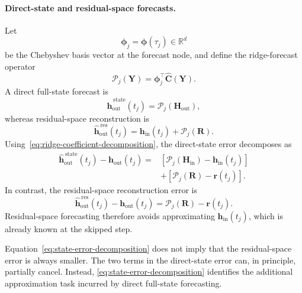 \paragraph{Direct-state and residual-space forecasts.}
Let
\begin{equation}
\boldsymbol{\phi}_j
=
\boldsymbol{\phi}(\tau_j)
\in\mathbb{R}^{d}
\end{equation}
be the Chebyshev basis vector at the forecast node, and define the
ridge-forecast operator
\begin{equation}
\mathcal{P}_j(\mathbf{Y})
=
\boldsymbol{\phi}_j^\top
\widehat{\mathbf{C}}(\mathbf{Y}).
\label{eq:ridge-forecast-operator}
\end{equation}
A direct full-state forecast is
\begin{equation}
\widehat{\mathbf{h}}_{\mathrm{out}}^{\,\mathrm{state}}(t_j)
=
\mathcal{P}_j
\left(
\mathbf{H}_{\mathrm{out}}
\right),
\end{equation}
whereas residual-space reconstruction is
\begin{equation}
\widehat{\mathbf{h}}_{\mathrm{out}}^{\,\mathrm{res}}(t_j)
=
\mathbf{h}_{\mathrm{in}}(t_j)
+
\mathcal{P}_j(\mathbf{R}).
\end{equation}
Using~\eqref{eq:ridge-coefficient-decomposition}, the direct-state error
decomposes as
\begin{align}
\widehat{\mathbf{h}}_{\mathrm{out}}^{\,\mathrm{state}}(t_j)
-
\mathbf{h}_{\mathrm{out}}(t_j)
={}&
\left[
\mathcal{P}_j
\left(
\mathbf{H}_{\mathrm{in}}
\right)
-
\mathbf{h}_{\mathrm{in}}(t_j)
\right]
\nonumber\\
&+
\left[
\mathcal{P}_j(\mathbf{R})
-
\mathbf{r}(t_j)
\right].
\label{eq:state-error-decomposition}
\end{align}
In contrast, the residual-space reconstruction error is
\begin{equation}
\widehat{\mathbf{h}}_{\mathrm{out}}^{\,\mathrm{res}}(t_j)
-
\mathbf{h}_{\mathrm{out}}(t_j)
=
\mathcal{P}_j(\mathbf{R})
-
\mathbf{r}(t_j).
\label{eq:residual-error-decomposition}
\end{equation}
Residual-space forecasting therefore avoids approximating
$\mathbf{h}_{\mathrm{in}}(t_j)$, which is already known at the skipped
step.

Equation~\eqref{eq:state-error-decomposition} does not imply that the
residual-space error is always smaller. The two terms in the direct-state
error can, in principle, partially cancel. Instead,
\eqref{eq:state-error-decomposition} identifies the additional
approximation task incurred by direct full-state forecasting.

